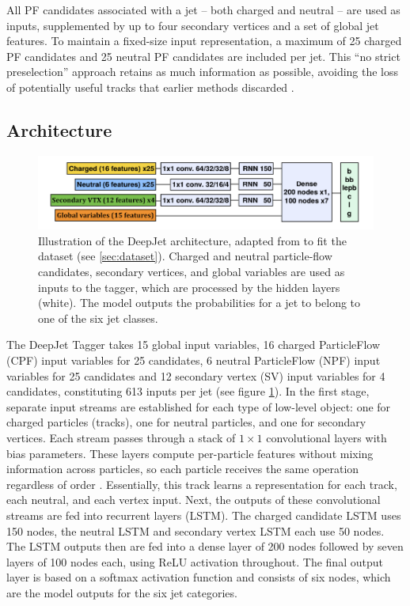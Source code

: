 All PF candidates associated with a jet – both charged and neutral – are used as inputs, supplemented by up to four secondary vertices and a set of global jet features. To maintain a fixed-size input representation, a maximum of 25 charged PF candidates and 25 neutral PF candidates are included per jet. This “no strict preselection” approach retains as much information as possible, avoiding the loss of potentially useful tracks that earlier methods discarded \cite{Bols_2020}.

\subsection{Architecture}

\begin{figure}[h]
    \centering
    \includegraphics[width=1\linewidth]{media/deepJet_architecture.png}
    \caption{Illustration of the DeepJet architecture, adapted from \cite{Bols_2020} to fit the dataset (see \ref{sec:dataset}). Charged and neutral particle-flow
candidates, secondary vertices, and global variables are used as inputs to the tagger, which are processed by the hidden layers (white). The model outputs the probabilities for a jet to belong to one of the six jet classes.}
    \label{fig:deepjetArchitecture}
\end{figure}

The DeepJet Tagger takes 15 global input variables, 16 charged ParticleFlow (CPF) input variables for 25 candidates, 6 neutral ParticleFlow (NPF) input variables for 25 candidates and 12 secondary vertex (SV) input variables for 4 candidates, constituting 613 inputs per jet (see figure \ref{fig:deepjetArchitecture}). In the first stage, separate input streams are established for each type of low-level object: one for charged particles (tracks), one for neutral particles, and one for secondary vertices. Each stream passes through a stack of $1\times1$ convolutional layers with bias parameters. These layers compute per-particle features without mixing information across particles, so each particle receives the same operation regardless of order \cite{Bols_2020}. Essentially, this track learns a representation for each track, each neutral, and each vertex input. Next, the outputs of these convolutional streams are fed into recurrent layers (LSTM). The charged candidate LSTM uses 150 nodes, the neutral LSTM and secondary vertex LSTM each use 50 nodes. The LSTM outputs then are fed into a dense layer of 200 nodes followed by seven layers of 100 nodes each, using ReLU activation throughout. The final output layer is based on a softmax activation function and consists of six nodes, which are the model outputs for the six jet categories.
